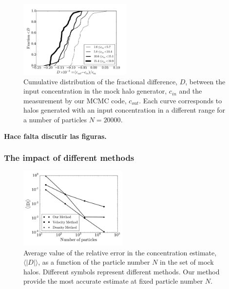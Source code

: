 \documentclass{emulateapj}
\newcommand{\avg}[1]{\langle{#1}\rangle}
\begin{document}
\begin{figure}
\begin{center}
  \includegraphics[width=0.50\textwidth]{mock_percentual_diff_conc_20000.pdf}
\end{center}
\caption{Cumulative distribution of the fractional difference, $D$, between
  the input concentration in the mock halo generator, $c_{in}$ and the
  measurement by our MCMC code, $c_{out}$. Each curve corresponds to
  halos generated with an input concentration in a different range for
  a number of particles $N=20000$.
    \label{fig:results_mocks_conc_20000}}
\end{figure}


{\bf Hace falta discutir las figuras.}

\subsubsection{The impact of different methods}

\begin{figure}
\begin{center}
  \includegraphics[width=0.48\textwidth]{error.pdf}
\end{center}
\caption{Average value of the relative error in the concentration
  estimate, $\avg{|D|}$, as a function of the particle number $N$ in
  the set of mock halos. Different symbols represent different
  methods. Our method provide the most accurate estimate at fixed
  particle number $N$.
    \label{fig:error}}
\end{figure}
\end{document}
